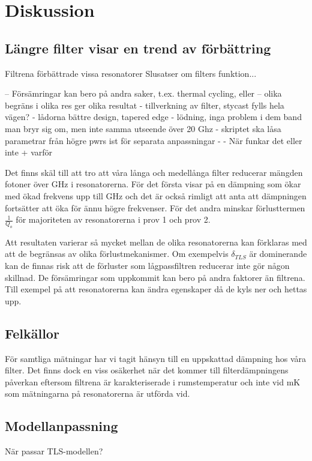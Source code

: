 \documentclass[main.tex]{subfiles}
\begin{document}
\chapter{Diskussion}
\label{ch:discussion} 

\section{Längre filter visar en trend av förbättring}
Filtrena förbättrade vissa resonatorer
Slusatser om filters funktion...


-- Försämringar kan bero på andra saker, t.ex. thermal cycling, eller 
-- olika begräns i olika res ger olika resultat 
- tillverkning av filter, stycast fylls hela vägen?
- lådorna bättre design, tapered edge
- lödning, inga problem i dem band man bryr sig om, men inte samma utseende över 20 Ghz
- skriptet ska låsa parametrar från högre pwrs ist för separata anpassningar 
- 
- När funkar det eller inte + varför

Det finns skäl till att tro att våra långa och medellånga filter reducerar mängden fotoner över \unit[88]{GHz} i resonatorerna. För det första visar  på en dämpning som ökar med ökad frekvens upp till \unit[50]{GHz} och det är också rimligt att anta att dämpningen fortsätter att öka för ännu högre frekvenser. För det andra minskar förlusttermen $\frac{1}{Q_o}$ för majoriteten av resonatorerna i prov 1 och prov 2.

Att resultaten varierar så mycket mellan de olika resonatorerna kan förklaras med att de begränsas av olika förlustmekanismer. Om exempelvis $\delta_{TLS}$ är dominerande kan de finnas risk att de förluster som lågpassfiltren reducerar inte gör någon skillnad.
De försämringar som uppkommit kan bero på andra faktorer än filtrena. Till exempel på att resonatorerna kan ändra egenskaper då de kyls ner och hettas upp.    


\section{Felkällor}
För samtliga mätningar har vi tagit hänsyn till en uppskattad dämpning hos våra filter. Det finns dock en viss osäkerhet när det kommer till filterdämpningens påverkan eftersom filtrena är karakteriserade i rumstemperatur och inte vid \unit[10]{mK} som mätningarna på resonatorerna är utförda vid.


\section{Modellanpassning}
När passar TLS-modellen? 
\end{document}
